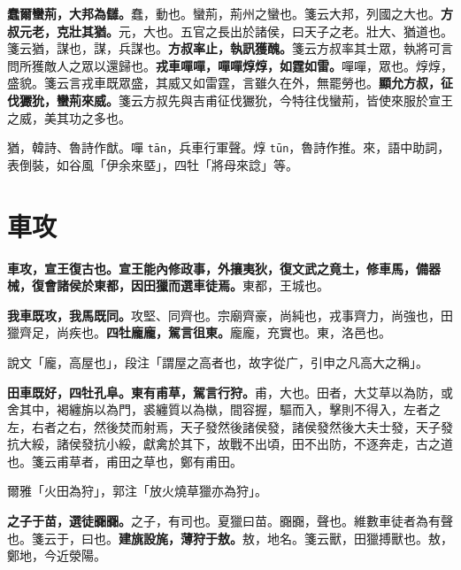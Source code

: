 \textbf{蠢爾蠻荊，大邦為讎。}{\footnotesize 蠢，動也。蠻荊，荊州之蠻也。箋云大邦，列國之大也。}\textbf{方叔元老，克壯其猶。}{\footnotesize 元，大也。五官之長出於諸侯，曰天子之老。壯大、猶道也。箋云猶，謀也，謀，兵謀也。}\textbf{方叔率止，執訊獲醜。}{\footnotesize 箋云方叔率其士眾，執將可言問所獲敵人之眾以還歸也。}\textbf{戎車嘽嘽，嘽嘽焞焞，如霆如雷。}{\footnotesize 嘽嘽，眾也。焞焞，盛貌。箋云言戎車既眾盛，其威又如雷霆，言雖久在外，無罷勞也。}\textbf{顯允方叔，征伐玁狁，蠻荊來威。}{\footnotesize 箋云方叔先與吉甫征伐玁狁，今特往伐蠻荊，皆使來服於宣王之威，美其功之多也。}

\begin{quoting}猶，韓詩、魯詩作猷。嘽 \texttt{tān}，兵車行軍聲。焞 \texttt{tūn}，魯詩作推。來，語中助詞，表倒裝，如谷風「伊余來塈」，四牡「將母來諗」等。\end{quoting}

\section{車攻}


\textbf{車攻，宣王復古也。宣王能內修政事，外攘夷狄，復文武之竟土，修車馬，備器械，復會諸侯於東都，因田獵而選車徒焉。}{\footnotesize 東都，王城也。}

\textbf{我車既攻，我馬既同。}{\footnotesize 攻堅、同齊也。宗廟齊豪，尚純也，戎事齊力，尚強也，田獵齊足，尚疾也。}\textbf{四牡龐龐，駕言徂東。}{\footnotesize 龐龐，充實也。東，洛邑也。}

\begin{quoting}說文「龐，高屋也」，段注「謂屋之高者也，故字從广，引申之凡高大之稱」。\end{quoting}

\textbf{田車既好，四牡孔阜。東有甫草，駕言行狩。}{\footnotesize 甫，大也。田者，大艾草以為防，或舍其中，褐纏旃以為門，裘纏質以為槸，間容握，驅而入，擊則不得入，左者之左，右者之右，然後焚而射焉，天子發然後諸侯發，諸侯發然後大夫士發，天子發抗大綏，諸侯發抗小綏，獻禽於其下，故戰不出頃，田不出防，不逐奔走，古之道也。箋云甫草者，甫田之草也，鄭有甫田。}

\begin{quoting}爾雅「火田為狩」，郭注「放火燒草獵亦為狩」。\end{quoting}

\textbf{之子于苗，選徒嚻嚻。}{\footnotesize 之子，有司也。夏獵曰苗。嚻嚻，聲也。維數車徒者為有聲也。箋云于，曰也。}\textbf{建旐設旄，薄狩于敖。}{\footnotesize 敖，地名。箋云獸，田獵搏獸也。敖，鄭地，今近滎陽。}

